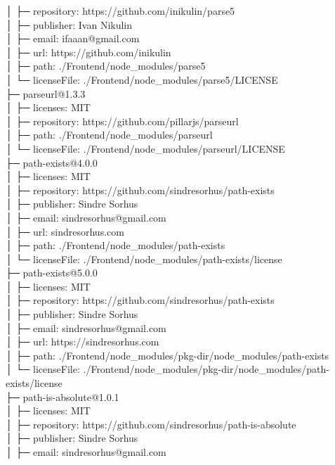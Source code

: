 │  ├─ repository: https://github.com/inikulin/parse5\\
│  ├─ publisher: Ivan Nikulin\\
│  ├─ email: ifaaan@gmail.com\\
│  ├─ url: https://github.com/inikulin\\
│  ├─ path: ./Frontend/node\_modules/parse5\\
│  └─ licenseFile: ./Frontend/node\_modules/parse5/LICENSE\\
├─ parseurl@1.3.3\\
│  ├─ licenses: MIT\\
│  ├─ repository: https://github.com/pillarjs/parseurl\\
│  ├─ path: ./Frontend/node\_modules/parseurl\\
│  └─ licenseFile: ./Frontend/node\_modules/parseurl/LICENSE\\
├─ path-exists@4.0.0\\
│  ├─ licenses: MIT\\
│  ├─ repository: https://github.com/sindresorhus/path-exists\\
│  ├─ publisher: Sindre Sorhus\\
│  ├─ email: sindresorhus@gmail.com\\
│  ├─ url: sindresorhus.com\\
│  ├─ path: ./Frontend/node\_modules/path-exists\\
│  └─ licenseFile: ./Frontend/node\_modules/path-exists/license\\
├─ path-exists@5.0.0\\
│  ├─ licenses: MIT\\
│  ├─ repository: https://github.com/sindresorhus/path-exists\\
│  ├─ publisher: Sindre Sorhus\\
│  ├─ email: sindresorhus@gmail.com\\
│  ├─ url: https://sindresorhus.com\\
│  ├─ path: ./Frontend/node\_modules/pkg-dir/node\_modules/path-exists\\
│  └─ licenseFile: ./Frontend/node\_modules/pkg-dir/node\_modules/path-exists/license\\
├─ path-is-absolute@1.0.1\\
│  ├─ licenses: MIT\\
│  ├─ repository: https://github.com/sindresorhus/path-is-absolute\\
│  ├─ publisher: Sindre Sorhus\\
│  ├─ email: sindresorhus@gmail.com\\
